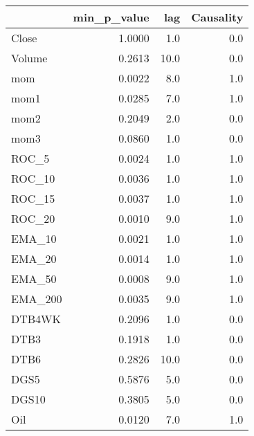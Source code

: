 \begin{tabular}{lrrr}
\toprule
{} &  min\_p\_value &   lag &  Causality \\
\midrule
Close   &       1.0000 &   1.0 &        0.0 \\
Volume  &       0.2613 &  10.0 &        0.0 \\
mom     &       0.0022 &   8.0 &        1.0 \\
mom1    &       0.0285 &   7.0 &        1.0 \\
mom2    &       0.2049 &   2.0 &        0.0 \\
mom3    &       0.0860 &   1.0 &        0.0 \\
ROC\_5   &       0.0024 &   1.0 &        1.0 \\
ROC\_10  &       0.0036 &   1.0 &        1.0 \\
ROC\_15  &       0.0037 &   1.0 &        1.0 \\
ROC\_20  &       0.0010 &   9.0 &        1.0 \\
EMA\_10  &       0.0021 &   1.0 &        1.0 \\
EMA\_20  &       0.0014 &   1.0 &        1.0 \\
EMA\_50  &       0.0008 &   9.0 &        1.0 \\
EMA\_200 &       0.0035 &   9.0 &        1.0 \\
DTB4WK  &       0.2096 &   1.0 &        0.0 \\
DTB3    &       0.1918 &   1.0 &        0.0 \\
DTB6    &       0.2826 &  10.0 &        0.0 \\
DGS5    &       0.5876 &   5.0 &        0.0 \\
DGS10   &       0.3805 &   5.0 &        0.0 \\
Oil     &       0.0120 &   7.0 &        1.0 \\
\bottomrule
\end{tabular}
